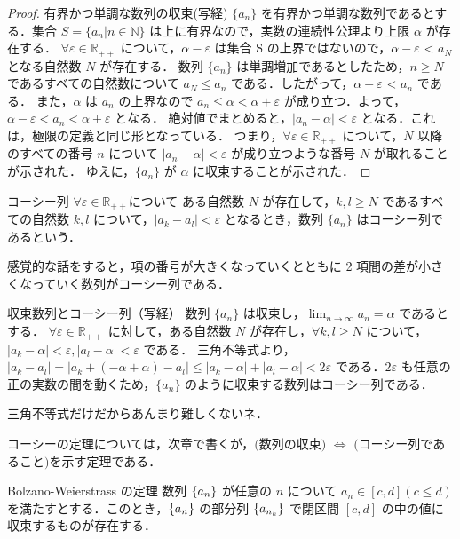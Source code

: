 \documentclass[xelatex,ja=standard,jafont=noto]{bxjsarticle}
\begin{document}
  \begin{proof}{有界かつ単調な数列の収束(写経)}{}
   $\{a_n\}$ を有界かつ単調な数列であるとする．集合 $S = \{a_n | n \in \mathbb{N}\}$ は上に有界なので，実数の連続性公理より上限 $\alpha$ が存在する．
   $\forall \varepsilon \in \mathbb{R_{++}}$ について，$\alpha - \varepsilon$ は集合 S の上界ではないので，$\alpha - \varepsilon$ < $a_N$ となる自然数 $N$ が存在する．
   数列 $\{a_n\}$ は単調増加であるとしたため，$n \geq N$ であるすべての自然数について $a_N \leq a_n$ である．したがって，$\alpha - \varepsilon$ < $a_n$ である．
   また，$\alpha$ は $a_n$ の上界なので $a_n \leq \alpha < \alpha + \varepsilon$ が成り立つ．よって，$\alpha - \varepsilon < a_n < \alpha + \varepsilon$ となる．
   絶対値でまとめると，$|a_n - \alpha| < \varepsilon$ となる．これは，極限の定義と同じ形となっている．
   つまり，$\forall \varepsilon \in \mathbb{R_{++}}$ について，$N$ 以降のすべての番号 $n$ について $|a_n - \alpha| < \varepsilon$ が成り立つような番号 $N$ が取れることが示された．
   ゆえに，$\{a_n\}$ が $\alpha$ に収束することが示された．
  \end{proof}

  \begin{tcb}{コーシー列}{}
   $\forall \varepsilon \in \mathbb{R_{++}}$について ある自然数 $N$ が存在して，$k, l \geq N$ であるすべての自然数 $k, l$
   について，$|a_k - a_l| < \varepsilon$ となるとき，数列 $\{a_n\}$ はコーシー列であるという．
  \end{tcb}
 感覚的な話をすると，項の番号が大きくなっていくとともに 2 項間の差が小さくなっていく数列がコーシー列である．

  \begin{theorem}{収束数列とコーシー列（写経）}{}
   数列 $\{a_n\}$ は収束し，$\lim_{n \rightarrow \infty} a_n = \alpha$ であるとする．
   $\forall\varepsilon \in \mathbb{R_{++}}$ に対して，ある自然数 $N$ が存在し，$\forall k, l \geq N$ について，
   $|a_k - \alpha| < \varepsilon, |a_l - \alpha| < \varepsilon$ である．
   三角不等式より，$|a_k - a_l| = |a_k + (-\alpha + \alpha) - a_l| \leq |a_k - \alpha| + |a_l - \alpha| < 2 \varepsilon$
   である．$2\varepsilon$ も任意の正の実数の間を動くため，$\{a_n\}$ のように収束する数列はコーシー列である．
  \end{theorem}
 三角不等式だけだからあんまり難しくないネ．

 コーシーの定理については，次章で書くが，$($数列の収束$)$ $\Leftrightarrow$ $($コーシー列であること$)$を示す定理である．

  \begin{theorem}{Bolzano-Weierstrass の定理}{}
   数列 $\{a_n\}$ が任意の $n$ について $a_n \in [c, d] (c \leq d)$を満たすとする．このとき，$\{a_n\}$ の部分列 $\{a_{n_k}\}$ で閉区間 $[c, d]$ の中の値に収束するものが存在する．
  \end{theorem}
\end{document}
